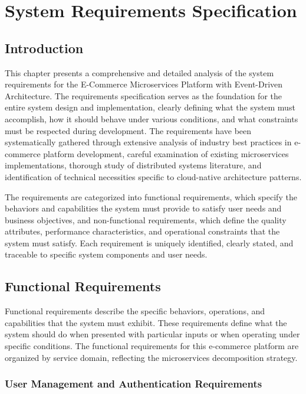 \chapter{System Requirements Specification}

\section{Introduction}

This chapter presents a comprehensive and detailed analysis of the system requirements for the E-Commerce Microservices Platform with Event-Driven Architecture. The requirements specification serves as the foundation for the entire system design and implementation, clearly defining what the system must accomplish, how it should behave under various conditions, and what constraints must be respected during development. The requirements have been systematically gathered through extensive analysis of industry best practices in e-commerce platform development, careful examination of existing microservices implementations, thorough study of distributed systems literature, and identification of technical necessities specific to cloud-native architecture patterns.

The requirements are categorized into functional requirements, which specify the behaviors and capabilities the system must provide to satisfy user needs and business objectives, and non-functional requirements, which define the quality attributes, performance characteristics, and operational constraints that the system must satisfy. Each requirement is uniquely identified, clearly stated, and traceable to specific system components and user needs.

\section{Functional Requirements}

Functional requirements describe the specific behaviors, operations, and capabilities that the system must exhibit. These requirements define what the system should do when presented with particular inputs or when operating under specific conditions. The functional requirements for this e-commerce platform are organized by service domain, reflecting the microservices decomposition strategy.

\subsection{User Management and Authentication Requirements}

